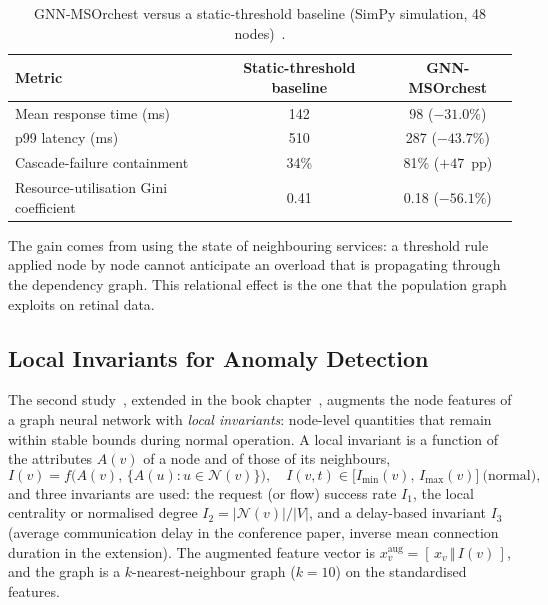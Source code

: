 \begin{table}[!htbp]
\centering
\caption[GNN-MSOrchest versus a static-threshold baseline]{GNN-MSOrchest versus a static-threshold baseline (SimPy simulation, 48
nodes)~\cite{belhadj2025icaart}.}
\label{tab:msorch}
\small
\begin{tabular}{@{}lcc@{}}
\toprule
Metric & Static-threshold baseline & GNN-MSOrchest \\
\midrule
Mean response time (ms) & 142 & 98 ($-31.0\%$) \\
p99 latency (ms) & 510 & 287 ($-43.7\%$) \\
Cascade-failure containment & 34\% & 81\% ($+47$~pp) \\
Resource-utilisation Gini coefficient & 0.41 & 0.18 ($-56.1\%$) \\
\bottomrule
\end{tabular}
\end{table}

The gain comes from using the state of neighbouring services: a threshold rule applied node
by node cannot anticipate an overload that is propagating through the dependency graph.
This relational effect is the one that the population graph exploits on retinal data.

\subsection{Local Invariants for Anomaly Detection}
\label{sec:invariants}

The second study~\cite{belhadj2026invariants}, extended in the book
chapter~\cite{belhadj2026lnaiinv}, augments the node features of a graph neural network
with \emph{local invariants}: node-level quantities that remain within stable bounds
during normal operation. A local invariant is a function of the attributes $A(v)$ of a
node and of those of its neighbours,
\begin{equation}
I(v) = f\bigl(A(v),\,\{A(u) : u\in\mathcal{N}(v)\}\bigr),
\quad I(v,t)\in\bigl[I_{\min}(v),\,I_{\max}(v)\bigr]\ \text{(normal)},
\label{eq:invariants}
\end{equation}
and three invariants are used: the request (or flow) success rate $I_1$, the local
centrality or normalised degree $I_2=|\mathcal{N}(v)|/|V|$, and a delay-based invariant
$I_3$ (average communication delay in the conference paper, inverse mean connection
duration in the extension). The augmented feature vector is
$x_v^{\mathrm{aug}}=[\,x_v\,\Vert\,I(v)\,]$, and the graph is a $k$-nearest-neighbour graph
($k=10$) on the standardised features.

